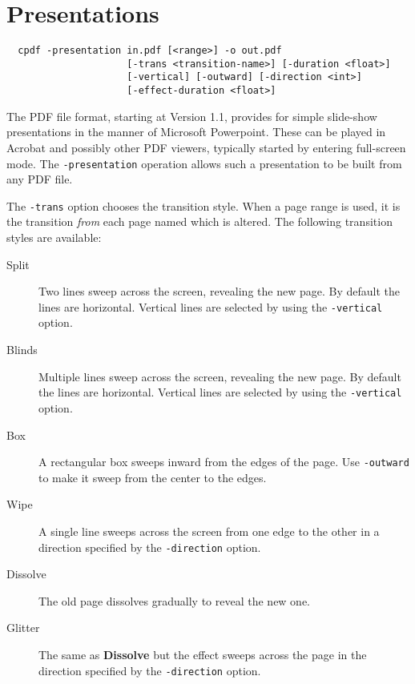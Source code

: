 \documentclass{book}
\begin{document}
\chapter{Presentations}
  \begin{framed}
  \small\noindent\begin{verbatim}
  cpdf -presentation in.pdf [<range>] -o out.pdf
                     [-trans <transition-name>] [-duration <float>]
                     [-vertical] [-outward] [-direction <int>]
                     [-effect-duration <float>]\end{verbatim}
\end{framed}

  \vspace{12mm}
The PDF file format, starting at Version 1.1, provides for simple slide-show
presentations in the manner of Microsoft Powerpoint. These can be played in
Acrobat and possibly other PDF viewers, typically started by entering
full-screen mode. The \texttt{-presentation} operation allows such a
presentation to be built from any PDF file.

The \texttt{-trans} option chooses the transition style. When a page range is
used, it is the transition \textit{from} each page named which is altered. The
following transition styles are available:

\begin{description}
  \item[Split]Two lines sweep across the screen, revealing the new page. By
default the lines are horizontal. Vertical lines are selected by using the
\texttt{-vertical} option.
  \item[Blinds]Multiple lines sweep across the screen, revealing the new page.
By default the lines are horizontal. Vertical lines are selected by using the
\texttt{-vertical} option.
  \item[Box]A rectangular box sweeps inward from the edges of the page. Use
\texttt{-outward} to make it sweep from the center to the edges.
  \item[Wipe]A single line sweeps across the screen from one edge to the other
in a direction specified by the \texttt{-direction} option.
  \item[Dissolve]The old page dissolves gradually to reveal the new one.
  \item[Glitter]The same as \textbf{Dissolve} but the effect sweeps across the
page in the direction specified by the \texttt{-direction} option.
\end{description}
\end{document}
